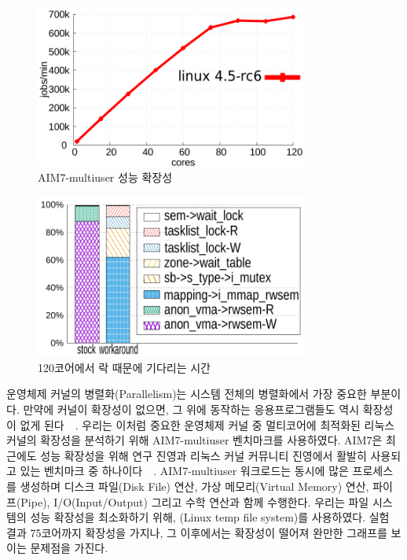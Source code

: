 
\begin{figure}[h]
    \centering
    \includegraphics[width=0.8\textwidth]{graph/aim7_default}
    \caption{AIM7-multiuser 성능 확장성}
  \label{fig:aim7_default}
\end{figure}

\begin{figure}[h]
    \centering
    \includegraphics[width=0.8\textwidth]{graph/lockstat}
    \caption{120코어에서 락 때문에 기다리는 시간}
  \label{fig:aim7_default}
\end{figure}

운영체제 커널의 병렬화(Parallelism)는 시스템 전체의 병렬화에서 가장 중요한 부분이다.
만약에 커널이 확장성이 없으면, 그 위에 동작하는 응용프로그램들도 역시 확장성이
없게 된다~\cite{Clements15SCR}~\cite{Boyd-WickizerCorey}.
우리는 이처럼 중요한 운영체제 커널 중 멀티코어에 최적화된 리눅스 커널의 확장성을 분석하기 위해 
AIM7-multiuser 벤치마크를 사용하였다.
AIM7은 최근에도 성능 확장성을 위해 연구 진영과 리눅스 커널 커뮤니티 진영에서 활발히 사용되고 있는 
벤치마크 중 하나이다~\cite{Bueso2015STP}~\cite{Bueso2014MCS}.
AIM7-multiuser 워크로드는 동시에 많은 프로세스를 생성하며 디스크 파일(Disk File) 연산, 가상 
메모리(Virtual Memory) 연산, 파이프(Pipe), I/O(Input/Output) 그리고 수학 연산과 함께 수행한다.
우리는 파일 시스템의 성능 확장성을 최소화하기 위해, (Linux temp file system)를 사용하였다.
실험 결과 75코어까지 확장성을 가지나, 그 이후에서는 확장성이 떨어져 완만한 그래프를 보이는 문제점을 가진다. 

